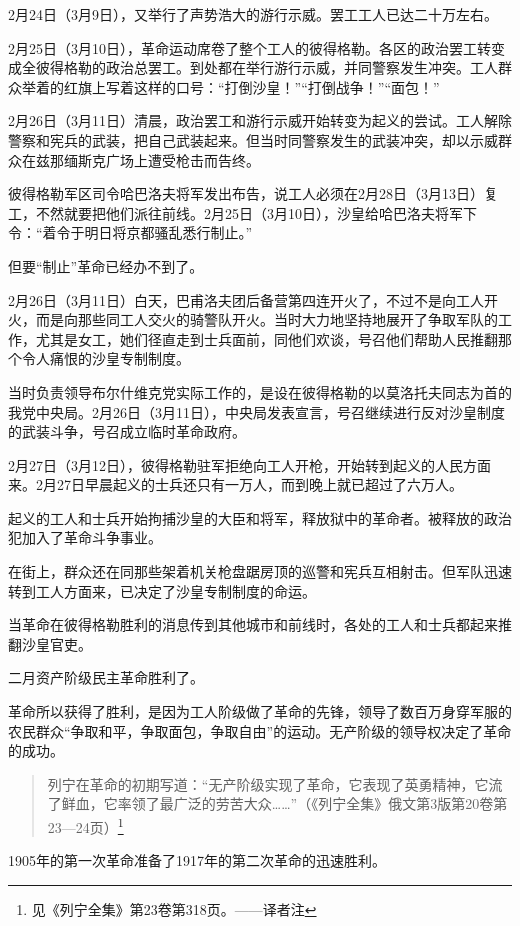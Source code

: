 2月24日（3月9日），又举行了声势浩大的游行示威。罢工工人已达二十万左右。

2月25日（3月10日），革命运动席卷了整个工人的彼得格勒。各区的政治罢工转变成全彼得格勒的政治总罢工。到处都在举行游行示威，并同警察发生冲突。工人群众举着的红旗上写着这样的口号：“打倒沙皇！”“打倒战争！”“面包！”

2月26日（3月11日）清晨，政治罢工和游行示威开始转变为起义的尝试。工人解除警察和宪兵的武装，把自己武装起来。但当时同警察发生的武装冲突，却以示威群众在兹那缅斯克广场上遭受枪击而告终。

彼得格勒军区司令哈巴洛夫将军发出布告，说工人必须在2月28日（3月13日）复工，不然就要把他们派往前线。2月25日（3月10日），沙皇给哈巴洛夫将军下令：“着令于明日将京都骚乱悉行制止。”

但要“制止”革命已经办不到了。

2月26日（3月11日）白天，巴甫洛夫团后备营第四连开火了，不过不是向工人开火，而是向那些同工人交火的骑警队开火。当时大力地坚持地展开了争取军队的工作，尤其是女工，她们径直走到士兵面前，同他们欢谈，号召他们帮助人民推翻那个令人痛恨的沙皇专制制度。

当时负责领导布尔什维克党实际工作的，是设在彼得格勒的以莫洛托夫同志为首的我党中央局。2月26日（3月11日），中央局发表宣言，号召继续进行反对沙皇制度的武装斗争，号召成立临时革命政府。

2月27日（3月12日），彼得格勒驻军拒绝向工人开枪，开始转到起义的人民方面来。2月27日早晨起义的士兵还只有一万人，而到晚上就已超过了六万人。

起义的工人和士兵开始拘捕沙皇的大臣和将军，释放狱中的革命者。被释放的政治犯加入了革命斗争事业。

在街上，群众还在同那些架着机关枪盘踞房顶的巡警和宪兵互相射击。但军队迅速转到工人方面来，已决定了沙皇专制制度的命运。

当革命在彼得格勒胜利的消息传到其他城市和前线时，各处的工人和士兵都起来推翻沙皇官吏。

二月资产阶级民主革命胜利了。

革命所以获得了胜利，是因为工人阶级做了革命的先锋，领导了数百万身穿军服的农民群众“争取和平，争取面包，争取自由”的运动。无产阶级的领导权决定了革命的成功。

\begin{quotation}
列宁在革命的初期写道：“无产阶级实现了革命，它表现了英勇精神，它流了鲜血，它率领了最广泛的劳苦大众……”（《列宁全集》俄文第3版第20卷第23—24页）\footnote{见《列宁全集》第23卷第318页。——译者注}
\end{quotation}

1905年的第一次革命准备了1917年的第二次革命的迅速胜利。

